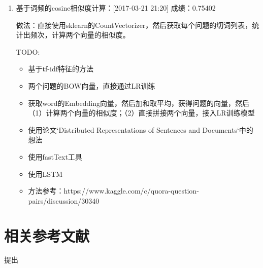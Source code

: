\begin{enumerate}
\item 基于词频的cosine相似度计算：[2017-03-21 21:20]
成绩：0.75402

做法：直接使用sklearn的CountVectorizer，然后获取每个问题的切词列表，统计出频次，计算两个向量的相似度。

TODO: 
\begin{itemize}
\item 基于tf-idf特征的方法
\item 两个问题的BOW向量，直接通过LR训练
\item 获取word的Embedding向量，然后加和取平均，获得问题的向量，然后（1）计算两个向量的相似度；（2）直接拼接两个向量，接入LR训练模型
\item 使用论文`Distributed Representations of Sentences and Documents`中的想法
\item 使用fastText工具
\item 使用LSTM
\item 方法参考：https://www.kaggle.com/c/quora-question-pairs/discussion/30340
\end{itemize}

\end{enumerate}


\section{相关参考文献}

\cite{Parikh:2016aa} 提出


\ifx\projectsnotes\undefined
    
\fi
